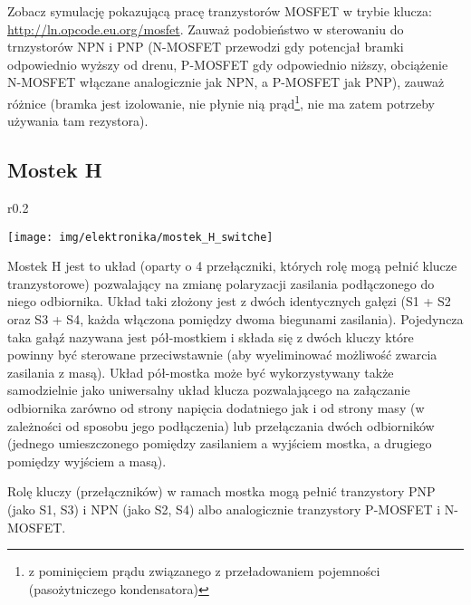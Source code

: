 \vspace{12pt}

Zobacz symulację pokazującą pracę tranzystorów MOSFET w trybie klucza: \url{http://ln.opcode.eu.org/mosfet}.
Zauważ podobieństwo w sterowaniu do trnzystorów NPN i PNP (N-MOSFET przewodzi gdy potencjał bramki odpowiednio wyższy od drenu, P-MOSFET gdy odpowiednio niższy, obciążenie N-MOSFET włączane analogicznie jak NPN, a P-MOSFET jak PNP),
	zauważ różnice (bramka jest izolowanie, nie płynie nią prąd\footnote{z pominięciem prądu związanego z przeładowaniem pojemności (pasożytniczego kondensatora)}, nie ma zatem potrzeby używania tam rezystora).


\subsection{Mostek H}

\begin{wrapfigure}{r}{0.2\textwidth}
  \begin{center}
    \vspace{-33pt}
    \texttt{[image: img/elektronika/mostek\_H\_switche]}
    \vspace{-27pt}
  \end{center}
\end{wrapfigure}

Mostek H jest to układ (oparty o 4 przełączniki, których rolę mogą pełnić klucze tranzystorowe) pozwalający na zmianę polaryzacji zasilania podłączonego do niego odbiornika. Układ taki złożony jest z dwóch identycznych gałęzi (S1 + S2 oraz S3 + S4, każda włączona pomiędzy dwoma biegunami zasilania). Pojedyncza taka gałąź nazywana jest pół-mostkiem i składa się z dwóch kluczy które powinny być sterowane przeciwstawnie (aby wyeliminować możliwość zwarcia zasilania z masą). Układ pół-mostka może być wykorzystywany także samodzielnie jako uniwersalny układ klucza pozwalającego na załączanie odbiornika zarówno od strony napięcia dodatniego jak i od strony masy (w zależności od sposobu jego podłączenia) lub przełączania dwóch odbiorników (jednego umieszczonego pomiędzy zasilaniem a wyjściem mostka, a drugiego pomiędzy wyjściem a masą).

Rolę kluczy (przełączników) w ramach mostka mogą pełnić tranzystory PNP (jako S1, S3) i NPN (jako S2, S4) albo analogicznie tranzystory P-MOSFET i N-MOSFET.

